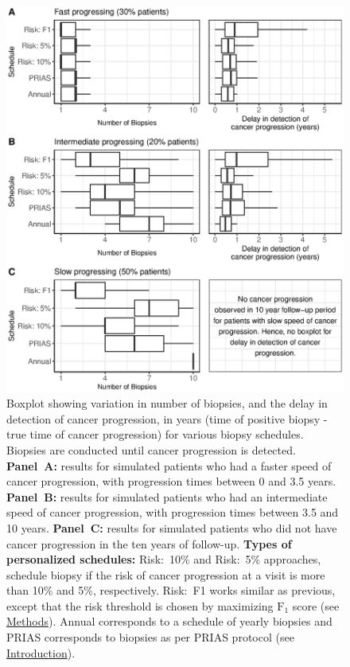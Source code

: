 \begin{figure}[!htb]
\captionsetup{justification=justified}
\centerline{\includegraphics[width=\columnwidth]{images/sim_res_combined.eps}}
\caption{Boxplot showing variation in number of biopsies, and the delay in detection of cancer progression, in years (time of positive biopsy - true time of cancer progression) for various biopsy schedules. Biopsies are conducted until cancer progression is detected. \textbf{Panel~A:} results for simulated patients who had a faster speed of cancer progression, with progression times between 0 and 3.5 years. \textbf{Panel~B:} results for simulated patients who had an intermediate speed of cancer progression, with progression times between 3.5 and 10 years. \textbf{Panel~C:} results for simulated patients who did not have cancer progression in the ten years of follow-up. \textbf{Types of personalized schedules:} Risk:~10\% and Risk:~5\% approaches, schedule biopsy if the risk of cancer progression at a visit is more than 10\% and 5\%, respectively. Risk:~F1 works similar as previous, except that the risk threshold is chosen by maximizing $\mbox{F}_1$ score (see \hyperref[sec:methods]{Methods}). Annual corresponds to a schedule of yearly biopsies and PRIAS corresponds to biopsies as per PRIAS protocol (see \hyperref[sec:introduction]{Introduction}).}
\label{fig:sim_res_combined}
\end{figure}

